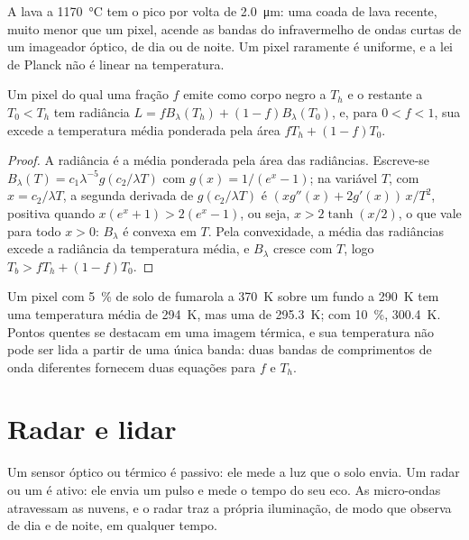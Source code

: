 A lava a \qty{1170}{\celsius} tem o pico por volta de \qty{2.0}{\micro\metre}: uma
coada de lava recente, muito menor que um pixel, acende as bandas do
infravermelho de ondas curtas de um imageador óptico, de dia ou de noite. Um pixel raramente é
uniforme, e a lei de Planck não é linear na temperatura.

\begin{proposition}\label{prop:b3:remote-sensing-gis:mixed}
Um pixel do qual uma fração $f$ emite como corpo negro a $T_h$ e o restante
a $T_0 < T_h$ tem radiância $L = fB_\lambda(T_h) + (1 - f)B_\lambda(T_0)$,
e, para $0 < f < 1$, sua  excede a
temperatura média ponderada pela área $fT_h + (1 - f)T_0$.
\end{proposition}

\begin{proof}
A radiância é a média ponderada pela área das radiâncias. Escreve-se $B_\lambda(T)
= c_1\lambda^{-5}g(c_2/\lambda T)$ com $g(x) = 1/(e^x - 1)$; na
variável $T$, com $x = c_2/\lambda T$, a segunda derivada de
$g(c_2/\lambda T)$ é $(x g''(x) + 2g'(x))\,x/T^2$, positiva quando $x(e^x + 1)
> 2(e^x - 1)$, ou seja, $x > 2\tanh(x/2)$, o que vale para todo $x > 0$:
$B_\lambda$ é convexa em $T$. Pela convexidade,
a média das radiâncias excede a radiância da temperatura média, e
$B_\lambda$ cresce com $T$, logo $T_b > fT_h + (1 - f)T_0$.
\end{proof}

Um pixel com \qty{5}{\percent} de
solo de fumarola a \qty{370}{K} sobre um fundo a \qty{290}{K} tem uma
temperatura média de \qty{294}{K}, mas uma  de \qty{295.3}{K};
com \qty{10}{\percent}, \qty{300.4}{K}. Pontos quentes se destacam em uma
imagem térmica, e sua temperatura não pode ser lida a partir de uma única banda: duas bandas
de comprimentos de onda diferentes fornecem duas equações para $f$ e $T_h$.

\section{Radar e lidar}\label{sec:b3:remote-sensing-gis:radar}

Um sensor óptico ou térmico é passivo: ele mede a luz que o solo
envia. Um radar ou um  é ativo: ele envia um pulso e mede o tempo do seu eco.
As micro-ondas atravessam as nuvens, e o radar traz a própria iluminação,
de modo que observa de dia e de noite, em qualquer tempo.

